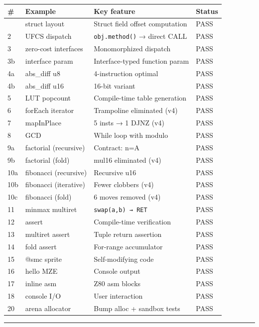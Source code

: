 \documentclass[
  11pt,
]{article}
\begin{document}
\begin{longtable}[]{@{}llll@{}}
\toprule\noalign{}
\# & Example & Key feature & Status \\
\midrule\noalign{}
\endhead
\bottomrule\noalign{}
\endlastfoot
1 & struct layout & Struct field offset computation & PASS \\
2 & UFCS dispatch & \texttt{obj.method()} → direct CALL & PASS \\
3 & zero-cost interfaces & Monomorphized dispatch & PASS \\
3b & interface param & Interface-typed function param & PASS \\
4a & abs\_diff u8 & 4-instruction optimal & PASS \\
4b & abs\_diff u16 & 16-bit variant & PASS \\
5 & LUT popcount & Compile-time table generation & PASS \\
6 & forEach iterator & Trampoline eliminated (v4) & PASS \\
7 & mapInPlace & 5 insts → 1 DJNZ (v4) & PASS \\
8 & GCD & While loop with modulo & PASS \\
9a & factorial (recursive) & Contract: n=A & PASS \\
9b & factorial (fold) & mul16 eliminated (v4) & PASS \\
10a & fibonacci (recursive) & Recursive u16 & PASS \\
10b & fibonacci (iterative) & Fewer clobbers (v4) & PASS \\
10c & fibonacci (fold) & 6 moves removed (v4) & PASS \\
11 & minmax multiret & \texttt{swap(a,b)\ →\ RET} & PASS \\
12 & assert & Compile-time verification & PASS \\
13 & multiret assert & Tuple return assertion & PASS \\
14 & fold assert & For-range accumulator & PASS \\
15 & @smc sprite & Self-modifying code & PASS \\
16 & hello MZE & Console output & PASS \\
17 & inline asm & Z80 asm blocks & PASS \\
18 & console I/O & User interaction & PASS \\
20 & arena allocator & Bump alloc + sandbox tests & PASS \\
\end{longtable}

\begin{center}\rule{0.5\linewidth}{0.5pt}\end{center}
\end{document}
